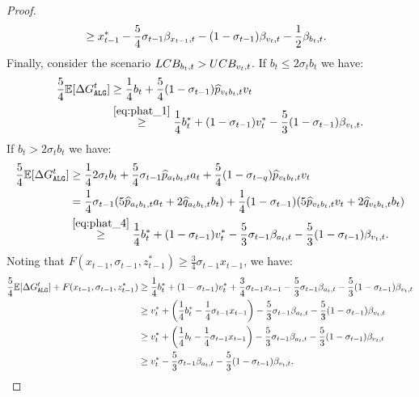 \begin{proof}
\begin{align*}
        &\ge x_{t-1}^*- \frac{5}{4}\sigma_{t-1}\beta_{x_{t-1},t}- (1-\sigma_{t-1})\beta_{v_t, t}- \frac{1}{2}\beta_{b_t, t}.
    \end{align*}
    Finally, consider the scenario $LCB_{b_t, t} > UCB_{v_{t},t}$. If $b_t \le 2\sigma_{t}b_t$ we have:
    \begin{align*}
        \frac{5}{4}\mathbb{E}[\Delta \Galg^t]  &\ge \frac{1}{4}b_t+\frac{5}{4}(1-\sigma_{t-1})\widehat{p}_{v_t b_t,t} v_t \\
        &\stackrel{\eqref{eq:phat_1}}{\ge} \frac{1}{4}b_t^*+(1-\sigma_{t-1})v_t^* - \frac{5}{3}(1-\sigma_{t-1})\beta_{v_t,t}.
    \end{align*}
    If $b_t > 2\sigma_{t}b_t$ we have:
    \begin{align*}
        \frac{5}{4}\mathbb{E}[\Delta \Galg^t]  &\ge \frac{1}{4}2 \sigma_t b_t+\frac{5}{4}\sigma_{t-1}\phat a_t+\frac{5}{4}(1-\sigma_{t-q})\widehat{p}_{v_t b_t,t} v_t\\
        &= \frac{1}{4}\sigma_{t-1}(5\phat a_t + 2\qhat b_t) + \frac{1}{4}(1-\sigma_{t-1})(5\widehat{p}_{v_t b_t, t}v_t +  2\widehat{q}_{v_t b_t,t} b_t) \\
        &\stackrel{\eqref{eq:phat_4}}{\ge} \frac{1}{4}b_t^*+(1-\sigma_{t-1})v_t^* -  \frac{5}{3}\sigma_{t-1}\betaa-\frac{5}{3}(1-\sigma_{t-1})\beta_{v_t,t}.
    \end{align*}
    Noting that $F(x_{t-1}, \sigma_{t-1}, z_{t-1}^*) \ge \frac{3}{4}\sigma_{t-1}x_{t-1}$, we have:
    \begin{align*}
        \frac{5}{4}\mathbb{E}[\Delta \Galg^t] +F(x_{t-1}, \sigma_{t-1}, z_{t-1}^*)&\ge \frac{1}{4}b_t^*+(1-\sigma_{t-1})v_t^* + \frac{3}{4}\sigma_{t-1}x_{t-1} -  \frac{5}{3}\sigma_{t-1}\betaa-\frac{5}{3}(1-\sigma_{t-1})\beta_{v_t,t}\\
        &\ge v_t^* + \left(\frac{1}{4}b_t^* - \frac{1}{4} \sigma_{t-1}x_{t-1}\right)-  \frac{5}{3}\sigma_{t-1}\betaa-\frac{5}{3}(1-\sigma_{t-1})\beta_{v_t,t} \\
        &\ge v_t^* + \left(\frac{1}{4}b_t - \frac{1}{4} \sigma_{t-1}x_{t-1}\right)-  \frac{5}{3}\sigma_{t-1}\betaa-\frac{5}{3}(1-\sigma_{t-1})\beta_{v_t,t} \\
        &\ge v_t^* -  \frac{5}{3}\sigma_{t-1}\betaa-\frac{5}{3}(1-\sigma_{t-1})\beta_{v_t,t}. \\
    \end{align*}

\end{proof}
